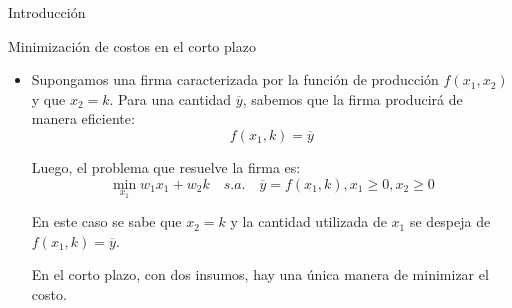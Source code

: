 \documentclass{beamer}
\theoremstyle{definition}
\begin{document}
\begin{frame}{Introducci\'on}
\begin{itemize}
		
	\end{itemize}
\end{frame}

\begin{frame}{Minimización de costos en el corto plazo}
	\begin{itemize}
		\item Supongamos una firma caracterizada por la funci\'{o}n de producci\'{o}n $f(x_{1},x_{2})$ y que $x_2=k$. Para una cantidad $\overline{y}$, sabemos que la firma producirá de manera eficiente: 
  \[f(x_1,k)=\overline{y}\]
  
  Luego, el problema que resuelve la firma es:
		\begin{equation*}
		\min_{x_{1}}w_{1}x_{1}+w_{2}k \quad s.a. \quad \overline{y}=f(x_{1},k), x_{1}\geq 0,x_{2}\geq 0
		\end{equation*}

En este caso se sabe que $x_2=k$ y la cantidad utilizada de $x_1$ se despeja de $f(x_1,k)=\overline{y}$. 

En el corto plazo, con dos insumos, hay una única manera de minimizar el costo.
		
		\end{itemize}
		\end{frame}
		
\end{document}
